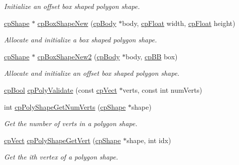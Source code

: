 \begin{DoxyCompactItemize}
\begin{DoxyCompactList}\small\item\em Initialize an offset box shaped polygon shape. \end{DoxyCompactList}\item 
\hypertarget{group__cp_poly_shape_gacdeb44c68f1860e12048b339d56eef67}{\hyperlink{structcp_shape}{cp\-Shape} $\ast$ \hyperlink{group__cp_poly_shape_gacdeb44c68f1860e12048b339d56eef67}{cp\-Box\-Shape\-New} (\hyperlink{structcp_body}{cp\-Body} $\ast$body, \hyperlink{group__basic_types_gac1ed65573e035bf892505768c852d8d3}{cp\-Float} width, \hyperlink{group__basic_types_gac1ed65573e035bf892505768c852d8d3}{cp\-Float} height)}\label{group__cp_poly_shape_gacdeb44c68f1860e12048b339d56eef67}

\begin{DoxyCompactList}\small\item\em Allocate and initialize a box shaped polygon shape. \end{DoxyCompactList}\item 
\hypertarget{group__cp_poly_shape_gaa7210464f25ddfd8a29f81f265d883df}{\hyperlink{structcp_shape}{cp\-Shape} $\ast$ \hyperlink{group__cp_poly_shape_gaa7210464f25ddfd8a29f81f265d883df}{cp\-Box\-Shape\-New2} (\hyperlink{structcp_body}{cp\-Body} $\ast$body, \hyperlink{structcp_b_b}{cp\-B\-B} box)}\label{group__cp_poly_shape_gaa7210464f25ddfd8a29f81f265d883df}

\begin{DoxyCompactList}\small\item\em Allocate and initialize an offset box shaped polygon shape. \end{DoxyCompactList}\item 
\hyperlink{group__basic_types_gab6e5d8afee598a57cd323abae5310244}{cp\-Bool} \hyperlink{group__cp_poly_shape_ga66e76627fbdd6032aaede226a0959620}{cp\-Poly\-Validate} (const \hyperlink{structcp_vect}{cp\-Vect} $\ast$verts, const int num\-Verts)
\item 
\hypertarget{group__cp_poly_shape_ga72ffc0d1f7ba9eb05ad105dc82531f23}{int \hyperlink{group__cp_poly_shape_ga72ffc0d1f7ba9eb05ad105dc82531f23}{cp\-Poly\-Shape\-Get\-Num\-Verts} (\hyperlink{structcp_shape}{cp\-Shape} $\ast$shape)}\label{group__cp_poly_shape_ga72ffc0d1f7ba9eb05ad105dc82531f23}

\begin{DoxyCompactList}\small\item\em Get the number of verts in a polygon shape. \end{DoxyCompactList}\item 
\hypertarget{group__cp_poly_shape_ga1ef71ccf85d93b7f272d220511603823}{\hyperlink{structcp_vect}{cp\-Vect} \hyperlink{group__cp_poly_shape_ga1ef71ccf85d93b7f272d220511603823}{cp\-Poly\-Shape\-Get\-Vert} (\hyperlink{structcp_shape}{cp\-Shape} $\ast$shape, int idx)}\label{group__cp_poly_shape_ga1ef71ccf85d93b7f272d220511603823}

\begin{DoxyCompactList}\small\item\em Get the {\ttfamily ith} vertex of a polygon shape. \end{DoxyCompactList}\end{DoxyCompactItemize}


